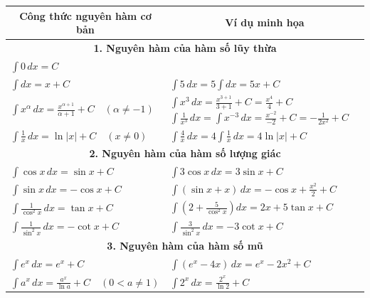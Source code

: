 \documentclass[12pt]{article}
\begin{document}
	\begin{center}
		\renewcommand{\arraystretch}{2.2} 
		\begin{tabular}{| p{7cm} | p{9cm} |}
			\hline
			\multicolumn{1}{|c|}{\textbf{Công thức nguyên hàm cơ bản}} & \multicolumn{1}{c|}{\textbf{Ví dụ minh họa}} \\
			\hline
			
			\multicolumn{2}{|c|}{\textbf{1. Nguyên hàm của hàm số lũy thừa}} \\
			\hline
			$\displaystyle \int 0 \,dx = C$ & 
			$ $ \\
			\hline
			$\displaystyle \int dx = x + C$ & 
			$\displaystyle \int 5 \,dx = 5 \int dx = 5x + C$ \\
			\hline
			$\displaystyle \int x^\alpha \,dx = \frac{x^{\alpha+1}}{\alpha+1} + C \quad (\alpha \neq -1)$ & 
			$\displaystyle \int x^3 \,dx = \frac{x^{3+1}}{3+1} + C = \frac{x^4}{4} + C$ \newline
			$\displaystyle \int \frac{1}{x^3} \,dx = \int x^{-3} \,dx = \frac{x^{-2}}{-2} + C = -\frac{1}{2x^2} + C$ \\
			\hline
			$\displaystyle \int \frac{1}{x} \,dx = \ln|x| + C \quad (x \neq 0)$ & 
			$\displaystyle \int \frac{4}{x} \,dx = 4 \int \frac{1}{x} \,dx = 4\ln|x| + C$ \\
			\hline
			
			\multicolumn{2}{|c|}{\textbf{2. Nguyên hàm của hàm số lượng giác}} \\
			\hline
			$\displaystyle \int \cos x \,dx = \sin x + C$ & 
			$\displaystyle \int 3\cos x \,dx = 3\sin x + C$ \\
			\hline
			$\displaystyle \int \sin x \,dx = -\cos x + C$ & 
			$\displaystyle \int (\sin x + x) \,dx = -\cos x + \frac{x^2}{2} + C$ \\
			\hline
			$\displaystyle \int \frac{1}{\cos^2 x} \,dx = \tan x + C$ & 
			$\displaystyle \int \left( 2 + \frac{5}{\cos^2 x} \right) dx = 2x + 5\tan x + C$ \\
			\hline
			$\displaystyle \int \frac{1}{\sin^2 x} \,dx = -\cot x + C$ & 
			$\displaystyle \int \frac{3}{\sin^2 x} \,dx = -3\cot x + C$ \\
			\hline
			
			\multicolumn{2}{|c|}{\textbf{3. Nguyên hàm của hàm số mũ}} \\
			\hline
			$\displaystyle \int e^x \,dx = e^x + C$ & 
			$\displaystyle \int (e^x - 4x) \,dx = e^x - 2x^2 + C$ \\
			\hline
			$\displaystyle \int a^x \,dx = \frac{a^x}{\ln a} + C \quad (0 < a \neq 1)$ & 
			$\displaystyle \int 2^x \,dx = \frac{2^x}{\ln 2} + C$ \\
			\hline
		\end{tabular}
	\end{center}
	
\end{document}
